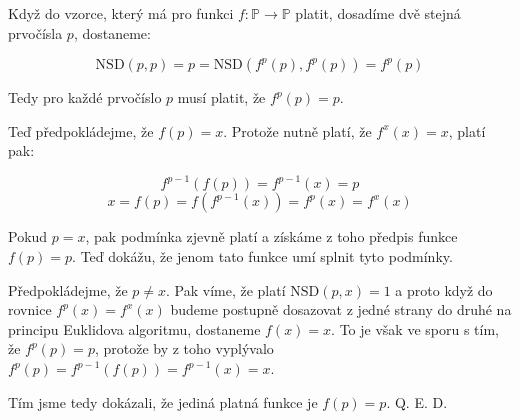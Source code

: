 \documentclass{fkssolpub}
\author{Ondřej Sedláček}
\begin{document}
Když do vzorce, který má pro funkci $f: \mathbb{P} \rightarrow \mathbb{P}$ platit, dosadíme dvě stejná prvočísla $p$, dostaneme:

\[
	\text{NSD}(p, p) = p = \text{NSD}(f^p(p), f^p(p)) = f^p(p)
\]

Tedy pro každé prvočíslo $p$ musí platit, že $f^p(p) = p$.

Teď předpokládejme, že $f(p) = x$. Protože nutně platí, že $f^x(x) = x$, platí pak:

\[
	f^{p - 1}(f(p)) = f^{p - 1}(x) = p
\]
\[
	x = f(p) = f(f^{p - 1}(x)) = f^p(x) = f^x(x)
\]

Pokud $p = x$, pak podmínka zjevně platí a získáme z toho předpis funkce $f(p) = p$. Teď dokážu, že jenom tato funkce umí splnit tyto podmínky.

Předpokládejme, že $p \neq x$. Pak víme, že platí $\text{NSD}(p, x) = 1$ a proto když do rovnice $f^p(x) = f^x(x)$ budeme postupně dosazovat z jedné strany do druhé na principu Euklidova algoritmu, dostaneme $f(x) = x$. To je však ve sporu s tím, že $f^p(p) = p$, protože by z toho vyplývalo $f^p(p) = f^{p - 1}(f(p)) = f^{p - 1}(x) = x$.

Tím jsme tedy dokázali, že jediná platná funkce je $f(p) = p$. Q. E. D.
\end{document}
